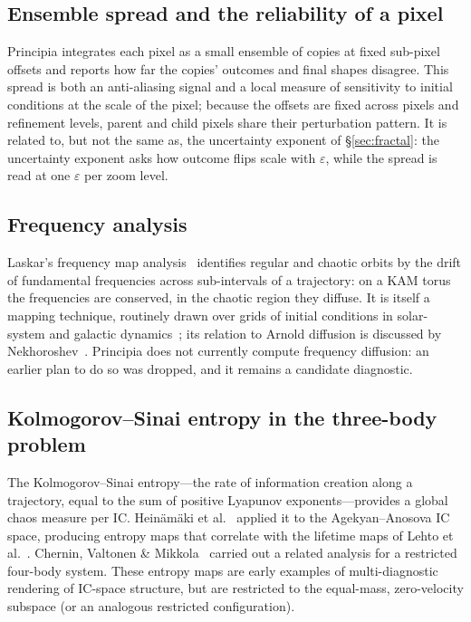 \documentclass[11pt,a4paper]{article}
\begin{document}
\subsection{Ensemble spread and the reliability of a pixel}
\label{sec:ensemble}

Principia integrates each pixel as a small ensemble of copies at fixed sub-pixel offsets and
reports how far the copies' outcomes and final shapes disagree.  This spread is both an
anti-aliasing signal and a local measure of sensitivity to initial conditions at the scale of
the pixel; because the offsets are fixed across pixels and refinement levels, parent and child
pixels share their perturbation pattern.  It is related to, but not the same as, the uncertainty
exponent of \S\ref{sec:fractal}: the uncertainty exponent asks how outcome flips scale with $\varepsilon$, while
the spread is read at one $\varepsilon$ per zoom level.

\subsection{Frequency analysis}
\label{sec:freqdiff}

Laskar's frequency map analysis~\cite{laskar1990,laskar1993} identifies regular and chaotic orbits
by the drift of fundamental frequencies across sub-intervals of a trajectory: on a KAM torus the
frequencies are conserved, in the chaotic region they diffuse.  It is itself a mapping technique,
routinely drawn over grids of initial conditions in solar-system and galactic
dynamics~\cite{laskar1993}; its relation to Arnold diffusion is discussed by
Nekhoroshev~\cite{nekhoroshev1977}.  Principia does not currently compute frequency diffusion: an
earlier plan to do so was dropped, and it remains a candidate diagnostic.

\subsection{Kolmogorov--Sinai entropy in the three-body problem}
\label{sec:ksentropy}

The Kolmogorov--Sinai entropy---the rate of information creation along a trajectory, equal to the
sum of positive Lyapunov exponents---provides a global chaos measure per IC.  Heinäm\"{a}ki et
al.~\cite{chernin2000} applied it to the Agekyan--Anosova IC space, producing entropy maps that
correlate with the lifetime maps of Lehto et al.~\cite{lehto2008}.  Chernin, Valtonen \&
Mikkola~\cite{chernin1994} carried out a related analysis for a restricted four-body system.
These entropy maps are early examples of multi-diagnostic rendering of IC-space structure, but
are restricted to the equal-mass, zero-velocity subspace (or an analogous restricted
configuration).
\end{document}
